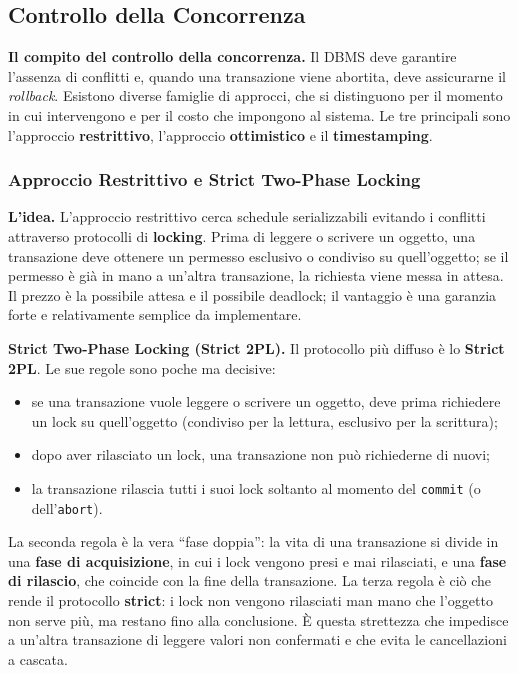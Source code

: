 \documentclass[12pt]{extarticle}
\begin{document}
\subsection{Controllo della Concorrenza}

\noindent \textbf{Il compito del controllo della concorrenza.} Il DBMS deve garantire l'assenza di conflitti e, quando una transazione viene abortita, deve assicurarne il \textit{rollback}. Esistono diverse famiglie di approcci, che si distinguono per il momento in cui intervengono e per il costo che impongono al sistema. Le tre principali sono l'approccio \textbf{restrittivo}, l'approccio \textbf{ottimistico} e il \textbf{timestamping}.

\subsubsection{Approccio Restrittivo e Strict Two-Phase Locking}

\noindent \textbf{L'idea.} L'approccio restrittivo cerca schedule serializzabili evitando i conflitti attraverso protocolli di \textbf{locking}. Prima di leggere o scrivere un oggetto, una transazione deve ottenere un permesso esclusivo o condiviso su quell'oggetto; se il permesso è già in mano a un'altra transazione, la richiesta viene messa in attesa. Il prezzo è la possibile attesa e il possibile deadlock; il vantaggio è una garanzia forte e relativamente semplice da implementare.

\medskip
\noindent \textbf{Strict Two-Phase Locking (Strict 2PL).} Il protocollo più diffuso è lo \textbf{Strict 2PL}. Le sue regole sono poche ma decisive:
\begin{itemize}
    \item se una transazione vuole leggere o scrivere un oggetto, deve prima richiedere un lock su quell'oggetto (condiviso per la lettura, esclusivo per la scrittura);
    \item dopo aver rilasciato un lock, una transazione non può richiederne di nuovi;
    \item la transazione rilascia tutti i suoi lock soltanto al momento del \texttt{commit} (o dell'\texttt{abort}).
\end{itemize}
La seconda regola è la vera ``fase doppia'': la vita di una transazione si divide in una \textbf{fase di acquisizione}, in cui i lock vengono presi e mai rilasciati, e una \textbf{fase di rilascio}, che coincide con la fine della transazione. La terza regola è ciò che rende il protocollo \textbf{strict}: i lock non vengono rilasciati man mano che l'oggetto non serve più, ma restano fino alla conclusione. È questa strettezza che impedisce a un'altra transazione di leggere valori non confermati e che evita le cancellazioni a cascata.
\end{document}

